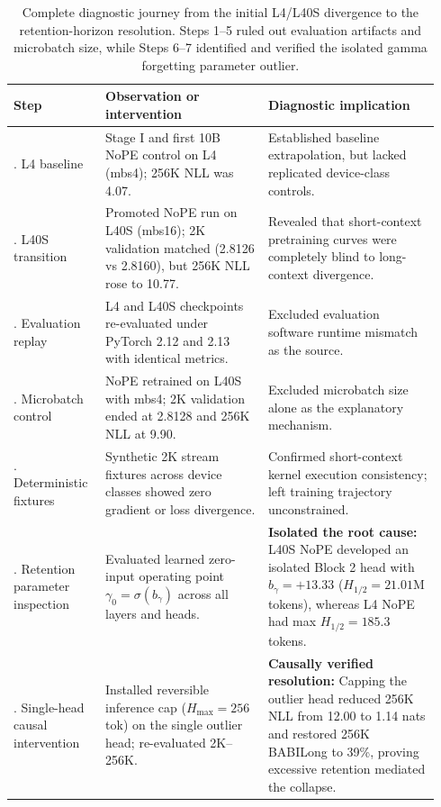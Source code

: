 \begin{table}[!ht]
\centering
\small
\setlength{\tabcolsep}{4pt}
\begin{tabular}{>{\raggedright\arraybackslash}p{0.20\linewidth}>{\raggedright\arraybackslash}p{0.36\linewidth}>{\raggedright\arraybackslash}p{0.38\linewidth}}
\toprule
\textbf{Step} & \textbf{Observation or intervention} & \textbf{Diagnostic implication} \\
\midrule
1. L4 baseline & Stage I and first 10B NoPE control on L4 (mbs4); 256K NLL was 4.07. & Established baseline extrapolation, but lacked replicated device-class controls. \\
2. L40S transition & Promoted NoPE run on L40S (mbs16); 2K validation matched (2.8126 vs 2.8160), but 256K NLL rose to 10.77. & Revealed that short-context pretraining curves were completely blind to long-context divergence. \\
3. Evaluation replay & L4 and L40S checkpoints re-evaluated under PyTorch 2.12 and 2.13 with identical metrics. & Excluded evaluation software runtime mismatch as the source. \\
4. Microbatch control & NoPE retrained on L40S with mbs4; 2K validation ended at 2.8128 and 256K NLL at 9.90. & Excluded microbatch size alone as the explanatory mechanism. \\
5. Deterministic fixtures & Synthetic 2K stream fixtures across device classes showed zero gradient or loss divergence. & Confirmed short-context kernel execution consistency; left training trajectory unconstrained. \\
6. Retention parameter inspection & Evaluated learned zero-input operating point $\gamma_0 = \sigma(b_\gamma)$ across all layers and heads. & \textbf{Isolated the root cause:} L40S NoPE developed an isolated Block 2 head with $b_\gamma = +13.33$ ($H_{1/2} = 21.01$M tokens), whereas L4 NoPE had max $H_{1/2} = 185.3$ tokens. \\
7. Single-head causal intervention & Installed reversible inference cap ($H_{\max} = 256$ tok) on the single outlier head; re-evaluated 2K--256K. & \textbf{Causally verified resolution:} Capping the outlier head reduced 256K NLL from 12.00 to 1.14 nats and restored 256K BABILong to 39\%, proving excessive retention mediated the collapse. \\
\bottomrule
\end{tabular}
\caption{Complete diagnostic journey from the initial L4/L40S divergence to the retention-horizon resolution. Steps 1--5 ruled out evaluation artifacts and microbatch size, while Steps 6--7 identified and verified the isolated gamma forgetting parameter outlier.}
\label{table:environment_diagnostic_journey}
\end{table}

